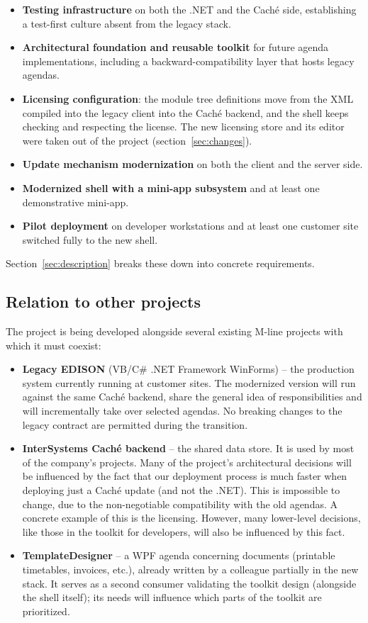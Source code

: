 \documentclass{article}
\begin{document}
\begin{itemize}
  \item \textbf{Testing infrastructure} on both the .NET and the Caché side, establishing a test-first culture absent from the legacy stack.
  \item \textbf{Architectural foundation and reusable toolkit} for future agenda implementations, including a backward-compatibility layer that hosts legacy agendas.
  \item \textbf{Licensing configuration}: the module tree definitions move from the XML compiled into the legacy client into the Caché backend, and the shell keeps checking and respecting the license. The new licensing store and its editor were taken out of the project (section~\ref{sec:changes}).
  \item \textbf{Update mechanism modernization} on both the client and the server side.
  \item \textbf{Modernized shell with a mini-app subsystem} and at least one demonstrative mini-app.
  \item \textbf{Pilot deployment} on developer workstations and at least one customer site switched fully to the new shell.
\end{itemize}

\noindent Section~\ref{sec:description} breaks these down into concrete requirements.

\subsection{Relation to other projects}
\label{sec:relation}

The project is being developed alongside several existing M-line projects with which it must coexist:

\begin{itemize}
  \item \textbf{Legacy EDISON} (VB/C\# .NET Framework WinForms) -- the production system currently running at customer sites. The modernized version will run against the same Caché backend, share the general idea of responsibilities and will incrementally take over selected agendas. No breaking changes to the legacy contract are permitted during the transition.
  \item \textbf{InterSystems Caché backend} -- the shared data store. It is used by most of the company's projects. Many of the project's architectural decisions will be influenced by the fact that our deployment process is much faster when deploying just a Caché update (and not the .NET). This is impossible to change, due to the non-negotiable compatibility with the old agendas. A concrete example of this is the licensing. However, many lower-level decisions, like those in the toolkit for developers, will also be influenced by this fact.
  \item \textbf{TemplateDesigner} -- a WPF agenda concerning documents (printable timetables, invoices, etc.), already written by a colleague partially in the new stack. It serves as a second consumer validating the toolkit design (alongside the shell itself); its needs will influence which parts of the toolkit are prioritized.
\end{itemize}
\end{document}
